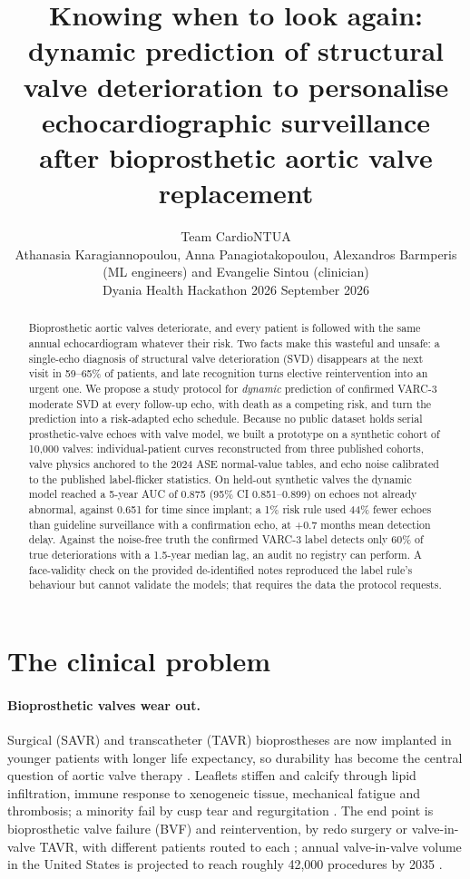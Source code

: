 \documentclass[11pt,a4paper]{article}
\title{\vspace{-1.2cm}\Large\textbf{Knowing when to look again:\\dynamic prediction of structural valve deterioration to personalise echocardiographic surveillance after bioprosthetic aortic valve replacement}}
\author{Team CardioNTUA\\\normalsize Athanasia Karagiannopoulou, Anna Panagiotakopoulou, Alexandros Barmperis (ML engineers) and Evangelie Sintou (clinician)\\\normalsize Dyania Health Hackathon 2026 \quad\textbullet\quad 17 September 2026}
\date{}
\begin{document}
\maketitle
\vspace{-0.9cm}
\begin{abstract}
\noindent Bioprosthetic aortic valves deteriorate, and every patient is followed with the same annual echocardiogram whatever their risk. Two facts make this wasteful and unsafe: a single-echo diagnosis of structural valve deterioration (SVD) disappears at the next visit in 59--65\% of patients, and late recognition turns elective reintervention into an urgent one. We propose a study protocol for \emph{dynamic} prediction of confirmed VARC-3 moderate SVD at every follow-up echo, with death as a competing risk, and turn the prediction into a risk-adapted echo schedule. Because no public dataset holds serial prosthetic-valve echoes with valve model, we built a prototype on a synthetic cohort of 10,000 valves: individual-patient curves reconstructed from three published cohorts, valve physics anchored to the 2024 ASE normal-value tables, and echo noise calibrated to the published label-flicker statistics. On held-out synthetic valves the dynamic model reached a 5-year AUC of 0.875 (95\% CI 0.851--0.899) on echoes not already abnormal, against 0.651 for time since implant; a 1\% risk rule used 44\% fewer echoes than guideline surveillance with a confirmation echo, at +0.7 months mean detection delay. Against the noise-free truth the confirmed VARC-3 label detects only 60\% of true deteriorations with a 1.5-year median lag, an audit no registry can perform. A face-validity check on the provided de-identified notes reproduced the label rule's behaviour but cannot validate the models; that requires the data the protocol requests.
\end{abstract}

\section{The clinical problem}

\paragraph{Bioprosthetic valves wear out.} Surgical (SAVR) and transcatheter (TAVR) bioprostheses are now implanted in younger patients with longer life expectancy, so durability has become the central question of aortic valve therapy \cite{trimaille2025}. Leaflets stiffen and calcify through lipid infiltration, immune response to xenogeneic tissue, mechanical fatigue and thrombosis; a minority fail by cusp tear and regurgitation \cite{kostyunin2020,wakami2022}. The end point is bioprosthetic valve failure (BVF) and reintervention, by redo surgery or valve-in-valve TAVR, with different patients routed to each \cite{geisler2026}; annual valve-in-valve volume in the United States is projected to reach roughly 42,000 procedures by 2035 \cite{genereux2025}.
\end{document}
